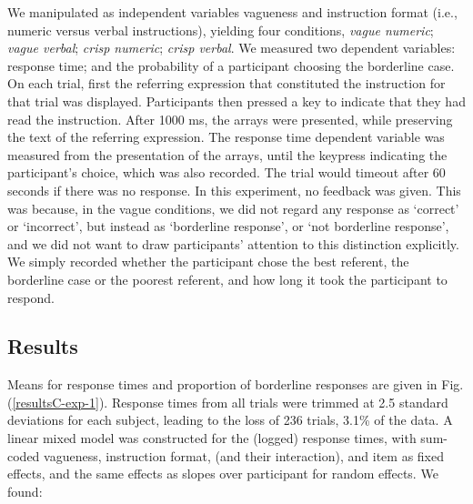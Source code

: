 We manipulated as independent variables vagueness and instruction format (i.e., numeric versus verbal instructions), yielding four conditions, \emph{vague numeric}; \emph{vague verbal}; \emph{crisp numeric}; \emph{crisp verbal}.
We measured two dependent variables: response time; and the probability of a participant choosing the borderline case. On each trial, first the referring expression that constituted the instruction for that trial was displayed. 
Participants then pressed a key to indicate that they had read the instruction. After 1000 ms, the arrays were presented, while preserving the text of the referring expression. The response time dependent variable was measured from the presentation of the arrays, until the keypress indicating the participant's choice, which was also recorded. The trial would timeout after 60 seconds if there was no response. In this experiment, no feedback was given. This was because, in the vague conditions, we did not regard any response as `correct' or `incorrect', but instead as `borderline response', or `not borderline response', and we did not want to draw participants' attention to this distinction explicitly. We simply recorded whether the participant chose the best referent, the borderline case or the poorest referent, and how long it took the participant to respond.

\subsection{Results} 

Means for response times and proportion of borderline responses are given in Fig. (\ref{resultsC-exp-1}). Response times from all trials were trimmed at 2.5 standard deviations for each subject, leading to the loss of 236 trials, 3.1\% of the data. A linear mixed model was constructed for the (logged) response times, with sum-coded vagueness, instruction format, (and their interaction), and item as fixed effects, and the same effects as slopes over participant for random effects. We found:

